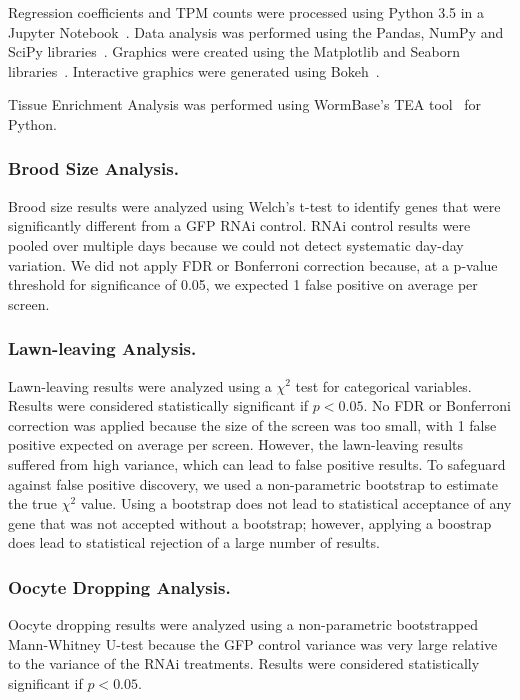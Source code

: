 \documentclass[9pt,twocolumn,twoside]{gsag3jnl}
\begin{document}
Regression coefficients and TPM counts were processed using Python 3.5 in a Jupyter Notebook~\citep{Perez2007}. Data analysis was performed using the Pandas, NumPy and SciPy libraries~\citep{McKinney2011,VanDerWalt2011,Oliphant2007}. Graphics were created using the Matplotlib and Seaborn libraries~\citep{Waskom,Hunter2007}. Interactive graphics were generated using Bokeh~\citep{Team2014}.

Tissue Enrichment Analysis was performed using WormBase's TEA tool~\citep{Angeles-Albores2016} for Python.

\subsubsection{Brood Size Analysis.}

Brood size results were analyzed using Welch's t-test to identify genes that were significantly different from a GFP RNAi control. RNAi control results were pooled over multiple days because we could not detect systematic day-day variation. We did not apply FDR or Bonferroni correction because, at a p-value threshold for significance of 0.05, we expected 1 false positive on average per screen.

\subsubsection{Lawn-leaving Analysis.}

Lawn-leaving results were analyzed using a $\chi^2$ test for categorical variables. Results were considered statistically significant if $p<0.05$. No FDR or Bonferroni correction was applied because the size of the screen was too small, with 1 false positive expected on average per screen. However, the lawn-leaving results suffered from high variance, which can lead to false positive results.
To safeguard against false positive discovery, we used a non-parametric bootstrap to estimate the true $\chi^2$ value. Using a bootstrap does not lead to statistical acceptance of any gene that was not accepted without a bootstrap; however, applying a boostrap does lead to statistical rejection of a large number of results.
\subsubsection{Oocyte Dropping Analysis.}

Oocyte dropping results were analyzed using a non-parametric bootstrapped Mann-Whitney U-test because the GFP control variance was very large relative to the variance of the RNAi treatments. Results were considered statistically significant if $p<0.05$.
\end{document}
